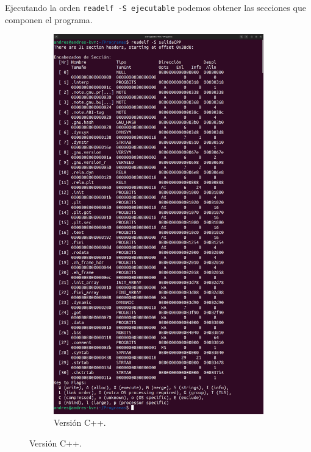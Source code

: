 \documentclass{article}
\begin{document}
Ejecutando la orden \verb|readelf -S ejecutable| podemos obtener las secciones que componen el programa.

\begin{figure}[H]
    \centering
    \begin{subfigure}{0.49\textwidth}
        \centering
        \includegraphics[width=\textwidth]{imagenes/CPP/merged.png}
        \caption{Versión C++.}
    \end{subfigure}

\end{figure}
\end{document}
